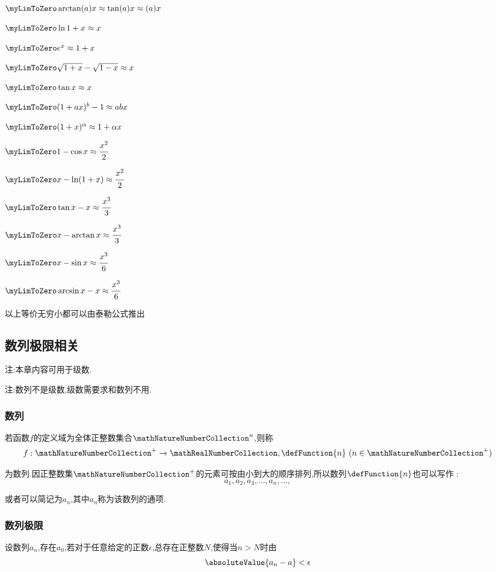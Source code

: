 {{{    $\myLimToZero \arctan(a)x \approx \tan(a)x \approx (a)x$

    $\myLimToZero \ln1+x \approx x$

    $\myLimToZero e^x \approx 1+x$

    $\myLimToZero \sqrt{1 + x} - \sqrt{1 - x} \approx x$

    $\myLimToZero \tan{x} \approx x$

    $\myLimToZero (1 + ax)^b - 1 \approx abx$

    $\myLimToZero (1+x)^\alpha \approx 1+\alpha x$

    $\myLimToZero 1 - \cos x \approx \cfrac{x^2}{2}$

    $\myLimToZero x - \ln(1 + x) \approx \cfrac{x^2}{2}$

    $\myLimToZero \tan x - x \approx \cfrac{x^3}{3}$

    $\myLimToZero x - \arctan x \approx \cfrac{x^3}{3}$

    $\myLimToZero x - \sin x \approx \cfrac{x^3}{6}$

    $\myLimToZero \arcsin x - x \approx \cfrac{x^3}{6}$

    以上等价无穷小都可以由泰勒公式推出
  }%

}%

\subsection{数列极限相关}{

  注:本章内容可用于级数.

  注:数列不是级数,级数需要求和数列不用.

  \subsubsection{数列}{
    若函数$f$的定义域为全体正整数集合$\mathNatureNumberCollection^n$,则称
    $$
      f : \mathNatureNumberCollection^+ \to \mathRealNumberCollection,\defFunction{n} \ (n \in \mathNatureNumberCollection^+)
    $$

    为数列.因正整数集$\mathNatureNumberCollection^+$的元素可按由小到大的顺序排列,所以数列$\defFunction{n}$也可以写作 :
    $$
      a_1,a_2,a_3,\dots,a_n,\dots,
    $$

    或者可以简记为${a_n}$,其中$a_n$称为该数列的通项.
  }%

  \subsubsection{数列极限}{
    设数列${a_n}$,存在$a_0$,若对于任意给定的正数$\epsilon$,总存在正整数$N$,使得当$n > N$时由
    $$
      \absoluteValue{a_n - a} < \epsilon
    $$

}}}
